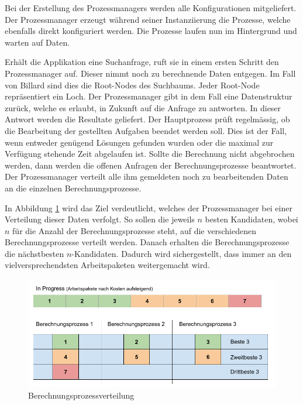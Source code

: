 Bei der Erstellung des Prozessmanagers werden alle Konfigurationen mitgeliefert. Der Prozessmanager erzeugt während seiner
Instanziierung die Prozesse, welche ebenfalls direkt konfiguriert werden. Die Prozesse laufen nun im Hintergrund und
warten auf Daten.

Erhält die Applikation eine Suchanfrage, ruft sie in einem ersten Schritt den Prozessmanager auf.
Dieser nimmt noch zu berechnende Daten entgegen. Im Fall von Billard sind dies die Root-Nodes des Suchbaums.
Jeder Root-Node repräsentiert ein Loch. Der Prozessmanager gibt in dem Fall eine Datenstruktur zurück, welche es erlaubt,
in Zukunft auf die Anfrage zu antworten. In dieser Antwort werden die Resultate geliefert.
Der Hauptprozess prüft regelmässig, ob die Bearbeitung der gestellten Aufgaben beendet werden soll.
Dies ist der Fall, wenn entweder genügend Lösungen gefunden wurden oder die maximal zur Verfügung stehende Zeit abgelaufen ist.
Sollte die Berechnung nicht abgebrochen werden, dann werden die offenen Anfragen der Berechnungsprozesse beantwortet.
Der Prozessmanager verteilt alle ihm gemeldeten noch zu bearbeitenden Daten an die einzelnen Berechnungsprozesse.

In Abbildung \ref{fig:berechnungsprozess_verteilung} wird das Ziel verdeutlicht, welches der Prozessmanager bei einer
Verteilung dieser Daten verfolgt. So sollen die jeweils $n$ besten Kandidaten, wobei $n$ für die Anzahl der Berechnungsprozesse
steht, auf die verschiedenen Berechnungsprozesse verteilt werden. Danach erhalten die Berechnungsprozesse die nächstbesten
$n$-Kandidaten. Dadurch wird sichergestellt, dass immer an den vielversprechendsten Arbeitspaketen weitergemacht wird.

\begin{figure}[h!]
    \begin{center}
        \includegraphics[width=0.8\linewidth]{../common/03_billiard_ai/resources/20_berechnungsprozess_verteilung.png}
    \end{center}
    \caption{Berechnungsprozessverteilung}
    \label{fig:berechnungsprozess_verteilung}
\end{figure}

